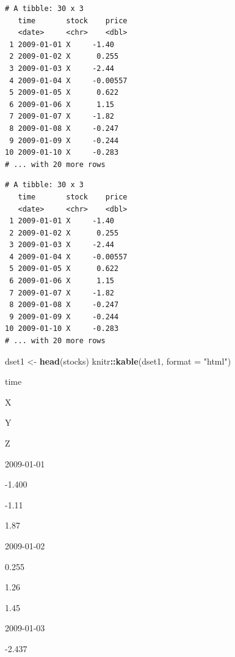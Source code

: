 \documentclass[]{book}
\newenvironment{Shaded}{\begin{snugshade}}{\end{snugshade}}
\newcommand{\DataTypeTok}[1]{\textcolor[rgb]{0.13,0.29,0.53}{#1}}
\newcommand{\KeywordTok}[1]{\textcolor[rgb]{0.13,0.29,0.53}{\textbf{#1}}}
\newcommand{\NormalTok}[1]{#1}
\newcommand{\OperatorTok}[1]{\textcolor[rgb]{0.81,0.36,0.00}{\textbf{#1}}}
\newcommand{\StringTok}[1]{\textcolor[rgb]{0.31,0.60,0.02}{#1}}
\theoremstyle{definition}
\theoremstyle{definition}
\theoremstyle{definition}
\theoremstyle{remark}
\begin{document}
\begin{verbatim}
# A tibble: 30 x 3
   time       stock    price
   <date>     <chr>    <dbl>
 1 2009-01-01 X     -1.40   
 2 2009-01-02 X      0.255  
 3 2009-01-03 X     -2.44   
 4 2009-01-04 X     -0.00557
 5 2009-01-05 X      0.622  
 6 2009-01-06 X      1.15   
 7 2009-01-07 X     -1.82   
 8 2009-01-08 X     -0.247  
 9 2009-01-09 X     -0.244  
10 2009-01-10 X     -0.283  
# ... with 20 more rows
\end{verbatim}

\begin{Shaded}
\end{Shaded}

\begin{verbatim}
# A tibble: 30 x 3
   time       stock    price
   <date>     <chr>    <dbl>
 1 2009-01-01 X     -1.40   
 2 2009-01-02 X      0.255  
 3 2009-01-03 X     -2.44   
 4 2009-01-04 X     -0.00557
 5 2009-01-05 X      0.622  
 6 2009-01-06 X      1.15   
 7 2009-01-07 X     -1.82   
 8 2009-01-08 X     -0.247  
 9 2009-01-09 X     -0.244  
10 2009-01-10 X     -0.283  
# ... with 20 more rows
\end{verbatim}

\begin{Shaded}
\begin{Highlighting}[]
\NormalTok{dset1 <-}\StringTok{ }\KeywordTok{head}\NormalTok{(stocks)}
\NormalTok{knitr}\OperatorTok{::}\KeywordTok{kable}\NormalTok{(dset1, }\DataTypeTok{format =} \StringTok{"html"}\NormalTok{)}
\end{Highlighting}
\end{Shaded}

time

X

Y

Z

2009-01-01

-1.400

-1.11

1.87

2009-01-02

0.255

1.26

1.45

2009-01-03

-2.437
\end{document}
